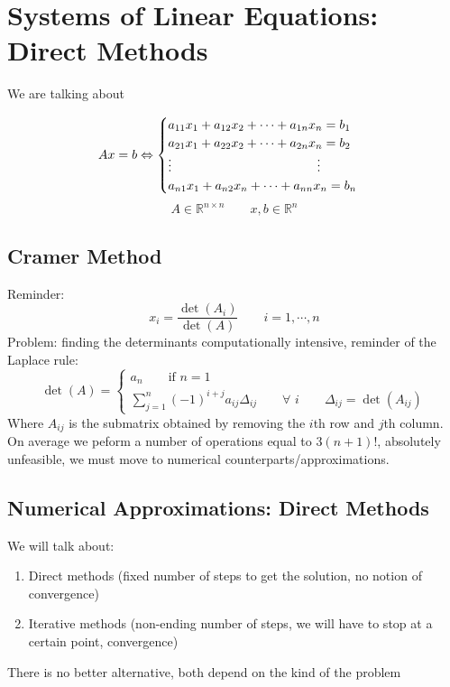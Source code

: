 
\section{Systems of Linear Equations: Direct Methods}
We are talking about
\begin{LARGE}
$$
    Ax=b\Leftrightarrow\begin{cases}
        a_{11}x_1+a_{12}x_2+\cdots+a_{1n}x_n=b_1\\
        a_{21}x_1+a_{22}x_2+\cdots+a_{2n}x_n=b_2\\
        \vdots\hspace{11.5em}\vdots\\
        a_{n1}x_1+a_{n2}x_n+\cdots+a_{nn}x_n=b_n\\        
    \end{cases}
$$
$$
A\in\mathbb{R}^{n\times n}\qquad x,b\in\mathbb{R}^{n}
$$
\end{LARGE}

\subsection{Cramer Method}
Reminder:
$$
x_i=\frac{\det(A_i)}{\det(A)}\qquad i=1,\cdots,n
$$
Problem: finding the determinants computationally intensive, reminder of the Laplace rule:
$$
\det(A)=
\begin{cases}
    a_n\qquad\text{if $n=1$}\\
    \sum_{j=1}^n(-1)^{i+j}a_{ij}\Delta_{ij}\qquad\forall\,\,i\qquad\Delta_{ij}=\det(A_{ij})
\end{cases}
$$
Where $A_{ij}$ is the submatrix obtained by removing the $i$th row and $j$th column.\\On average we peform a number of operations equal to $3(n+1)!$, absolutely unfeasible, we must move to numerical counterparts/approximations.

\subsection{Numerical Approximations: Direct Methods}
We will talk about:
\begin{enumerate}[1)]
    \item Direct methods (fixed number of steps to get the solution, no notion of convergence)
    \item Iterative methods (non-ending number of steps, we will have to stop at a certain point, convergence)
\end{enumerate}
There is no better alternative, both depend on the kind of the problem

